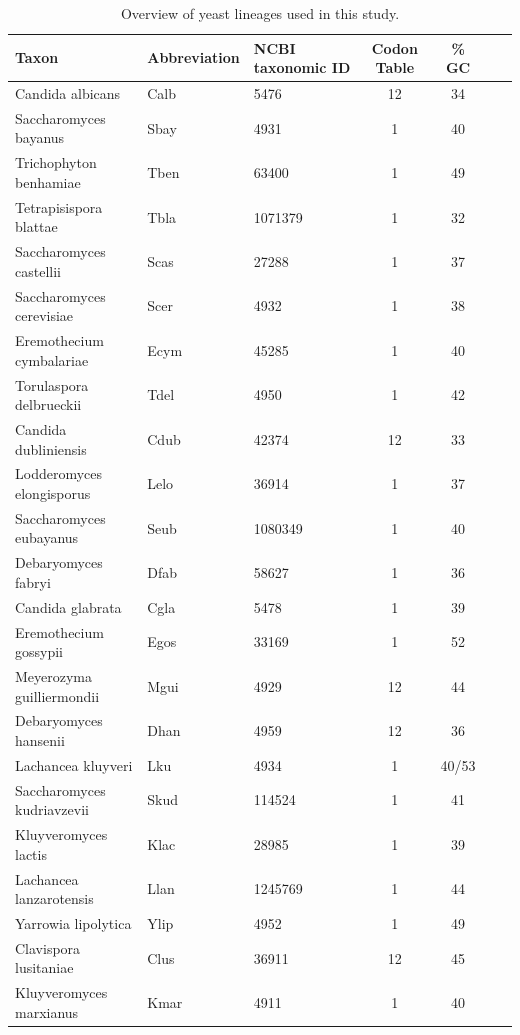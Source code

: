 \documentclass[fleqn,letterpaper]{article}
\begin{document}
\begin{table}
    \centering
    \caption{Overview of yeast lineages used in this study.}
\begin{tabular}{  l  l  l  c  c  l  l  }
\hline
	Taxon 				& Abbreviation 	& NCBI taxonomic ID 	& Codon Table	& \% GC  \\ \hline
	Candida albicans 		& Calb 		& 5476 			&	12	& 34 	 \\
	Saccharomyces bayanus 		& Sbay 		& 4931 			&	1	& 40 	 \\
	Trichophyton benhamiae 		& Tben		& 63400 		&	1	& 49 	 \\
	Tetrapisispora blattae 		& Tbla 		& 1071379 		&	1	& 32 	 \\
	Saccharomyces castellii 	& Scas 		& 27288 		&	1	& 37 	 \\
	Saccharomyces cerevisiae 	& Scer 		& 4932 			&	1	& 38 	 \\
	Eremothecium cymbalariae 	& Ecym 		& 45285 		&	1	& 40 	 \\
	Torulaspora delbrueckii 	& Tdel 		& 4950 			&	1	& 42 	 \\
	Candida dubliniensis 		& Cdub 		& 42374 		&	12	& 33 	 \\
	Lodderomyces elongisporus 	& Lelo 		& 36914 		&	1	& 37 	 \\
	Saccharomyces eubayanus 	& Seub 		& 1080349 		&	1	& 40 	 \\ 
	Debaryomyces fabryi 		& Dfab 		& 58627 		&	1	& 36 	 \\ 
	Candida glabrata 		& Cgla 		& 5478 			&	1	& 39 	 \\
	Eremothecium gossypii 		& Egos 		& 33169 		&	1	& 52 	 \\
	Meyerozyma guilliermondii 	& Mgui 		& 4929 			&	12	& 44 	 \\
	Debaryomyces hansenii 		& Dhan 		& 4959 			&	12	& 36 	 \\
	Lachancea kluyveri 		& Lku 		& 4934 			&	1	& 40/53  \\
	Saccharomyces kudriavzevii 	& Skud 		& 114524 		&	1	& 41 	 \\
	Kluyveromyces lactis 		& Klac 		& 28985 		&	1	& 39 	 \\
	Lachancea lanzarotensis 	& Llan 		& 1245769 		&	1	& 44 	 \\ 
	Yarrowia lipolytica 		& Ylip 		& 4952 			&	1	& 49 	 \\
	Clavispora lusitaniae 		& Clus 		& 36911 		&	12	& 45 	 \\ 
	Kluyveromyces marxianus 	& Kmar 		& 4911 			&	1	& 40 	 \\ 

\end{tabular}
\end{table}
\end{document}
